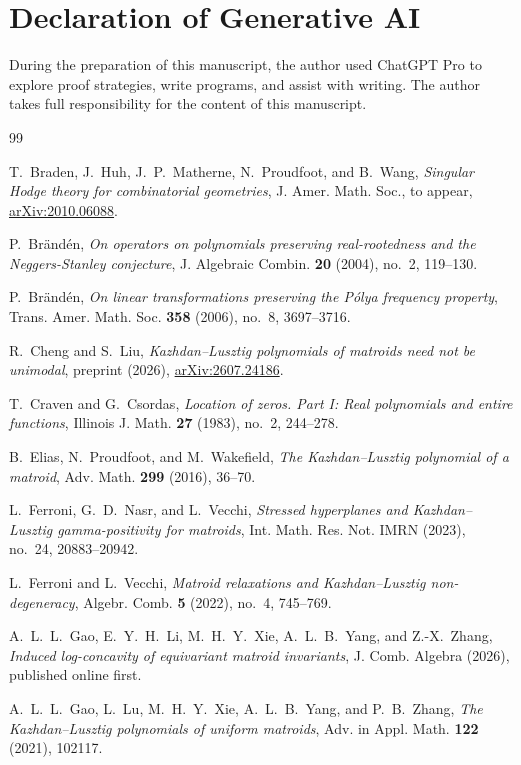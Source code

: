 \documentclass[11pt]{article}
\numberwithin{equation}{section}
\theoremstyle{remark}\newtheorem{remark}[theorem]{Remark}
\begin{document}
\section*{Declaration of Generative AI}
During the preparation of this manuscript, the author used ChatGPT Pro
to explore proof strategies, write programs, and assist with writing.
The author takes full responsibility for the content of this manuscript.

\begin{thebibliography}{99}
\small

T.~Braden, J.~Huh, J.~P.~Matherne, N.~Proudfoot, and B.~Wang,
\emph{Singular Hodge theory for combinatorial geometries},
J. Amer. Math. Soc., to appear,
\href{https://arxiv.org/abs/2010.06088}{arXiv:2010.06088}.

P.~Br\"and\'en,
\emph{On operators on polynomials preserving real-rootedness and the
Neggers-Stanley conjecture},
J. Algebraic Combin. \textbf{20} (2004), no.~2, 119--130.

P.~Br\"and\'en,
\emph{On linear transformations preserving the P\'olya frequency property},
Trans. Amer. Math. Soc. \textbf{358} (2006), no.~8, 3697--3716.

R.~Cheng and S.~Liu,
\emph{Kazhdan--Lusztig polynomials of matroids need not be unimodal},
preprint (2026),
\href{https://arxiv.org/abs/2607.24186}{arXiv:2607.24186}.

T.~Craven and G.~Csordas,
\emph{Location of zeros. Part I: Real polynomials and entire functions},
Illinois J. Math. \textbf{27} (1983), no.~2, 244--278.

B.~Elias, N.~Proudfoot, and M.~Wakefield,
\emph{The Kazhdan--Lusztig polynomial of a matroid},
Adv. Math. \textbf{299} (2016), 36--70.

L.~Ferroni, G.~D.~Nasr, and L.~Vecchi,
\emph{Stressed hyperplanes and Kazhdan--Lusztig gamma-positivity for matroids},
Int. Math. Res. Not. IMRN (2023), no.~24, 20883--20942.

L.~Ferroni and L.~Vecchi,
\emph{Matroid relaxations and Kazhdan--Lusztig non-degeneracy},
Algebr. Comb. \textbf{5} (2022), no.~4, 745--769.

A.~L.~L.~Gao, E.~Y.~H.~Li, M.~H.~Y.~Xie, A.~L.~B.~Yang, and Z.-X.~Zhang,
\emph{Induced log-concavity of equivariant matroid invariants},
J. Comb. Algebra (2026), published online first.

A.~L.~L.~Gao, L.~Lu, M.~H.~Y.~Xie, A.~L.~B.~Yang, and P.~B.~Zhang,
\emph{The Kazhdan--Lusztig polynomials of uniform matroids},
Adv. in Appl. Math. \textbf{122} (2021), 102117.


\end{thebibliography}
\end{document}
